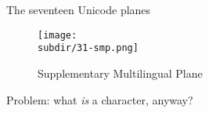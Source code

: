 \documentclass[../index.tex]{subfiles}
\begin{document}
\renewcommand{\currenttitle}{The seventeen Unicode planes}
\begin{frame}{\currenttitle}
%
%
%
%
  \vspace*{1em}
  \begin{figure}
    \centering
    \texttt{[image: \\subdir/31-smp.png]}
    \caption{Supplementary Multilingual Plane}
  \end{figure}
\end{frame}

\begin{frame}[standout]
%
  Problem: what \textit{is} a character, anyway?
\end{frame}
\end{document}
